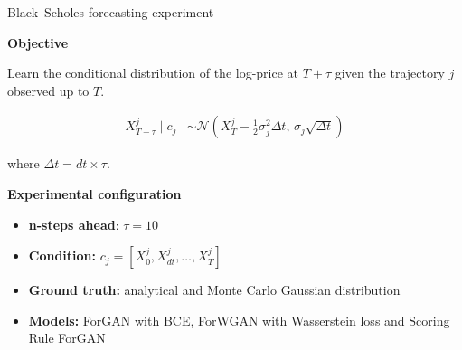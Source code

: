 \begin{frame}{Black--Scholes forecasting experiment}

\textbf{Objective}

Learn the conditional distribution of the log-price at
$T+\tau$ given the trajectory $j$ observed up to $T$.

\vspace{0.15cm}

\begin{equation}
\begin{aligned}
X_{T+\tau}^j \mid c_j
&\sim
\mathcal{N}
\left(
X_T^j-\frac{1}{2}\sigma_j^2\Delta t,
\,
\sigma_j\sqrt{\Delta t}
\right)
\end{aligned}
\end{equation}

where $\Delta t = dt \times \tau$.

\vspace{0.45cm}

\textbf{Experimental configuration}
\begin{itemize}
    \item \textbf{n-steps ahead}: $\tau = 10$
    \item \textbf{Condition:} $c_j=[X_0^j,X_{dt}^j,\ldots,X_T^j]$
    \item \textbf{Ground truth:} analytical and Monte Carlo Gaussian distribution
    \item \textbf{Models:} ForGAN with BCE, ForWGAN with Wasserstein loss and Scoring Rule ForGAN
\end{itemize}
\end{frame}

